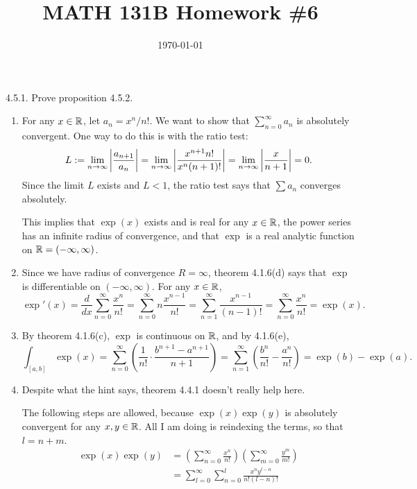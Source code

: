 \documentclass{article}
\date{\today}
\title{MATH 131B Homework \#6}
\begin{document}
\maketitle

\begin{prob}
    4.5.1. Prove proposition 4.5.2.
\end{prob}
\begin{enumerate}[label=(\alph*)]
    \item For any $x \in \mathbb{R}$, let $a_n = x^n/n!$. We want to show that $\sum_{n=0}^\infty a_n$ is absolutely convergent. One way to do this is with the ratio test:
        \[ L := \lim_{n \rightarrow \infty} \left\lvert  \frac{a_{n+1}}{a_n}  \right\rvert = \lim_{n \rightarrow \infty} \left\lvert  \frac{x^{n+1}n!}{x^n(n+1)!}  \right\rvert = \lim_{n \rightarrow \infty} \left\lvert  \frac{x}{n+1}  \right\rvert = 0. \]
        Since the limit $L$ exists and $L < 1$, the ratio test says that $\sum a_n$ converges absolutely.
        \par
        This implies that $\exp(x)$ exists and is real for any $x \in \mathbb{R}$, the power series has an infinite radius of convergence, and that $\exp$ is a real analytic function on $\mathbb{R}=(-\infty, \infty)$.
    \item Since we have radius of convergence $R=\infty$, theorem 4.1.6(d) says that $\exp$ is differentiable on $(-\infty, \infty)$. For any $x \in \mathbb{R}$,
        \[ \exp'(x) = \frac{d}{dx} \sum_{n=0}^\infty \frac{x^n}{n!} = \sum_{n=0}^\infty n \frac{x^{n-1}}{n!} = \sum_{n=1}^\infty \frac{x^{n-1}}{(n-1)!} = \sum_{n=0}^\infty \frac{x^n}{n!} = \exp(x). \]
    \item By theorem 4.1.6(c), $\exp$ is continuous on $\mathbb{R}$, and by 4.1.6(e),
        \[ \int_{[a,b]} \exp(x) = \sum_{n=0}^\infty \left( \frac{1}{n!} \cdot \frac{b^{n+1}-a^{n+1}}{n+1} \right) = \sum_{n=1}^\infty \left( \frac{b^n}{n!} - \frac{a^n}{n!} \right) = \exp(b) - \exp(a). \]
    \item Despite what the hint says, theorem 4.4.1 doesn't really help here.
        \par
        The following steps are allowed, because $\exp(x)\exp(y)$ is absolutely convergent for any $x,y \in \mathbb{R}$. All I am doing is reindexing the terms, so that $l = n + m$.
        \begin{align*}
            \exp(x) \exp(y) &= \left( \sum_{n=0}^\infty \frac{x^n}{n!} \right) \left( \sum_{m=0}^\infty \frac{y^m}{m!} \right) \\
                            &= \sum_{l=0}^\infty \sum_{n=0}^l \frac{x^n y^{l-n}}{n! (l-n)!} \\

\end{align*}
\end{enumerate}
\end{document}

